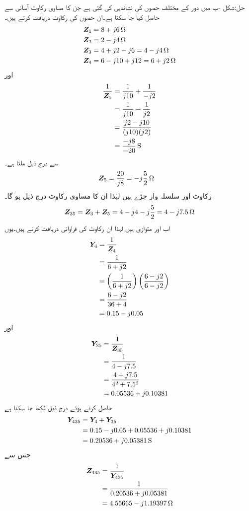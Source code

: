 حل:شکل -ب میں دور کے مختلف حصوں کی نشاندہی کی گئی ہے جن کا مساوی رکاوٹ آسانی سے حاصل کیا جا سکتا ہے۔ان حصوں کی رکاوٹ دریافت کرتے ہیں۔
\begin{align*}
{\ensuremath{{\boldsymbol{Z}}}}_1&=8+j6 \, \si{\ohm}\\
{{\boldsymbol{Z}}}_2&=2-j4 \, \si{\ohm}\\
{{\boldsymbol{Z}}}_3&=4+j2-j6=4-j4 \, \si{\ohm}\\
{{\boldsymbol{Z}}}_4&=6-j10+j12=6+j2 \,\si{\ohm}
\end{align*}
اور 
\begin{align*}
\frac{1}{\bZ_5}&=\frac{1}{j10}+\frac{1}{-j2}\\
&=\frac{1}{j10}-\frac{1}{j2}\\
&=\frac{j2-j10}{(j10)(j2)}\\
&=\frac{-j8}{-20} \, \si{\siemens}
\end{align*}
سے درج ذیل ملتا ہے۔
\begin{align*}
{\ensuremath{{\boldsymbol{Z}}}}_5&=\frac{20}{j8}=-j\frac{5}{2} \, \si{\ohm}
\end{align*}
رکاوٹ  اور  سلسلہ وار جڑے ہیں لہٰذا ان کا مساوی رکاوٹ درج ذیل ہو گا۔
\begin{align*}
{\ensuremath{{\boldsymbol{Z}}}}_{35}={{\boldsymbol{Z}}}_3+{{\boldsymbol{Z}}}_5=4-j4-j\frac{5}{2}=4-j7.5 \, \si{\ohm}
\end{align*}
اب  اور  متوازی ہیں لہٰذا ان رکاوٹ کی فراوانی دریافت کرتے ہیں۔یوں
\begin{align*}
{\ensuremath{{\boldsymbol{Y}}}}_4&=\frac{1}{{{\boldsymbol{Z}}}_4}\\
&=\frac{1}{6+j2}\\
&=\left(\frac{1}{6+j2}\right)\left( \frac{6-j2}{6-j2}\right)\\
&=\frac{6-j2}{36+4}\\
&=0.15-j 0.05
\end{align*}
اور
\begin{align*}
{\ensuremath{{\boldsymbol{Y}}}}_{35}&=\frac{1}{{{\boldsymbol{Z}}}_{35}}\\
&=\frac{1}{4-j7.5}\\
&=\frac{4+j7.5}{4^2+7.5^2}\\
&=0.05536+j0.10381
\end{align*}
حاصل کرتے ہوئے درج ذیل لکھا جا سکتا ہے
\begin{align*}
\bY_{435}&=\bY_4+\bY_{35}\\
&=0.15-j 0.05+0.05536+j0.10381\\
&=0.20536+j0.05381 \, \si{\siemens}
\end{align*}
جس سے 
\begin{align*}
{\ensuremath{{\boldsymbol{Z}}}}_{435}&=\frac{1}{{{\boldsymbol{Y}}}_{435}}\\
&=\frac{1}{0.20536+j0.05381}\\
&=4.55665-j1.19397 \, \si{\ohm}
\end{align*}
